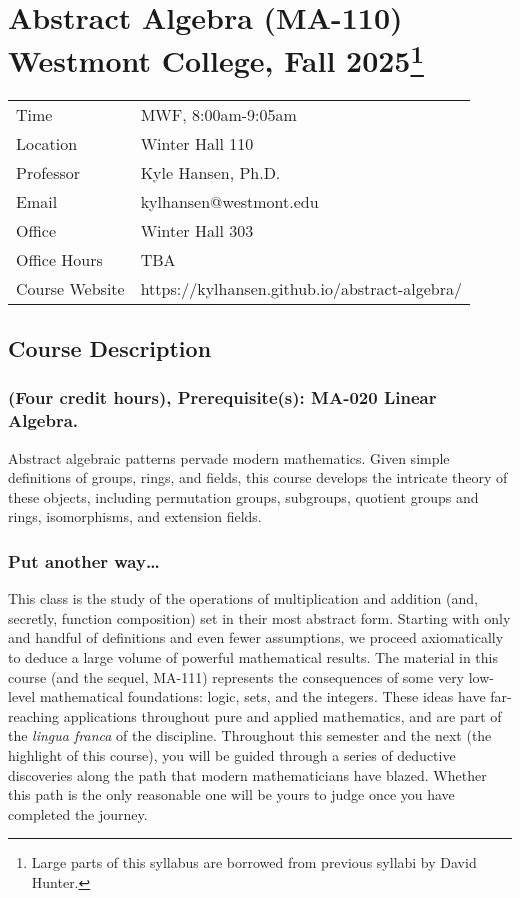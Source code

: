 \documentclass[
  twoside]{article}
\author{}
\date{\vspace{-2.5em}}
\begin{document}
\section[Abstract Algebra (MA-110) Westmont College, Fall
2025]{\texorpdfstring{Abstract Algebra (MA-110) Westmont College, Fall
2025\footnote{Large parts of this syllabus are borrowed from previous
  syllabi by David Hunter.}}{Abstract Algebra (MA-110) Westmont College, Fall 2025}}\label{abstract-algebra-ma-110-westmont-college-fall-20252}

\begin{tabular}[t]{ll}
\toprule
Time & MWF, 8:00am-9:05am\\
Location & Winter Hall 110\\
Professor & Kyle Hansen, Ph.D.\\
Email & kylhansen@westmont.edu\\
Office & Winter Hall 303\\
\addlinespace
Office Hours & TBA\\
Course Website & https://kylhansen.github.io/abstract-algebra/\\
\bottomrule
\end{tabular}

\subsection{Course Description}\label{course-description}

\subsubsection{(Four credit hours), Prerequisite(s): MA-020 Linear
Algebra.}\label{four-credit-hours-prerequisites-ma-020-linear-algebra.}

Abstract algebraic patterns pervade modern mathematics. Given simple
definitions of groups, rings, and fields, this course develops the
intricate theory of these objects, including permutation groups,
subgroups, quotient groups and rings, isomorphisms, and extension
fields.

\subsubsection{Put another way\ldots{}}\label{put-another-way}

This class is the study of the operations of multiplication and addition
(and, secretly, function composition) set in their most abstract form.
Starting with only and handful of definitions and even fewer
assumptions, we proceed axiomatically to deduce a large volume of
powerful mathematical results. The material in this course (and the
sequel, MA-111) represents the consequences of some very low-level
mathematical foundations: logic, sets, and the integers. These ideas
have far-reaching applications throughout pure and applied mathematics,
and are part of the \emph{lingua franca} of the discipline. Throughout
this semester and the next (the highlight of this course), you will be
guided through a series of deductive discoveries along the path that
modern mathematicians have blazed. Whether this path is the only
reasonable one will be yours to judge once you have completed the
journey.
\end{document}
